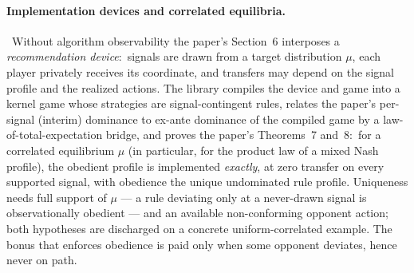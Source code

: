 
\paragraph{Implementation devices and correlated equilibria.}\
Without algorithm observability the paper's Section~6 interposes a
\emph{recommendation device}:\ signals are drawn from a target
distribution $\mu$, each player privately receives its coordinate,
and transfers may depend on the signal profile and the realized
actions.  The library compiles the device and game into a kernel game
whose strategies are signal-contingent rules, relates the paper's
per-signal (interim) dominance to ex-ante dominance of the compiled
game by a law-of-total-expectation bridge, and proves the paper's
Theorems~7 and~8:\ for a correlated equilibrium $\mu$ (in particular,
for the product law of a mixed Nash profile), the obedient profile is
implemented \emph{exactly}, at zero transfer on every supported
signal, with obedience the unique undominated rule profile.
Uniqueness needs full support of $\mu$ — a rule deviating only at a
never-drawn signal is observationally obedient — and an available
non-conforming opponent action; both hypotheses are discharged on a
concrete uniform-correlated example.  The bonus that enforces
obedience is paid only when some opponent deviates, hence never on
path.

